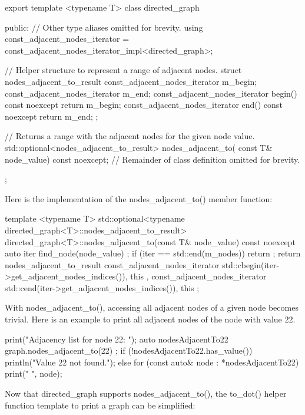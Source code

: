 \begin{cpp}
export template <typename T>
class directed_graph
{
    public:
        // Other type aliases omitted for brevity.
        using const_adjacent_nodes_iterator =
            const_adjacent_nodes_iterator_impl<directed_graph>;

        // Helper structure to represent a range of adjacent nodes.
        struct nodes_adjacent_to_result
        {
            const_adjacent_nodes_iterator m_begin;
            const_adjacent_nodes_iterator m_end;
            const_adjacent_nodes_iterator begin() const noexcept{ return m_begin; }
            const_adjacent_nodes_iterator end() const noexcept { return m_end; }
        };

        // Returns a range with the adjacent nodes for the given node value.
        std::optional<nodes_adjacent_to_result> nodes_adjacent_to(
            const T& node_value) const noexcept;
        // Remainder of class definition omitted for brevity.
};
\end{cpp}

Here is the implementation of the nodes\_adjacent\_to() member function:

\begin{cpp}
template <typename T>
std::optional<typename directed_graph<T>::nodes_adjacent_to_result>
    directed_graph<T>::nodes_adjacent_to(const T& node_value) const noexcept
{
    auto iter { find_node(node_value) };
    if (iter == std::end(m_nodes)) { return {}; }
    return nodes_adjacent_to_result {
        const_adjacent_nodes_iterator {
            std::cbegin(iter->get_adjacent_nodes_indices()), this },
        const_adjacent_nodes_iterator {
            std::cend(iter->get_adjacent_nodes_indices()), this }
    };
}
\end{cpp}

With nodes\_adjacent\_to(), accessing all adjacent nodes of a given node becomes trivial. Here is an example to print all adjacent nodes of the node with value 22.

\begin{cpp}
print("Adjacency list for node 22: ");
auto nodesAdjacentTo22 { graph.nodes_adjacent_to(22) };
if (!nodesAdjacentTo22.has_value()) {
    println("Value 22 not found.");
} else {
    for (const auto& node : *nodesAdjacentTo22) { print("{} ", node); }
}
\end{cpp}


Now that directed\_graph supports nodes\_adjacent\_to(), the to\_dot() helper function template to print a graph can be simplified:

